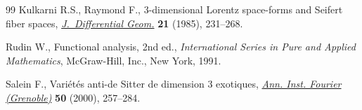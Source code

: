\documentclass[pdftex]{sigma}
\numberwithin{equation}{section}
\begin{document}
\begin{thebibliography}{99}
Kulkarni R.S., Raymond F., {$3$}-dimensional {L}orentz space-forms and
 {S}eifert fiber spaces, \href{https://doi.org/10.4310/jdg/1214439564}{\textit{J.~Differential Geom.}} \textbf{21} (1985),
 231--268.

Rudin W., Functional analysis, 2nd ed., \textit{International Series in Pure and
 Applied Mathematics}, McGraw-Hill, Inc., New York, 1991.

Salein F., Vari\'et\'es anti-de {S}itter de dimension 3 exotiques, \href{https://doi.org/10.5802/aif.1754}{\textit{Ann.
 Inst. Fourier (Grenoble)}} \textbf{50} (2000), 257--284.

\end{thebibliography}\LastPageEnding
\end{document}
